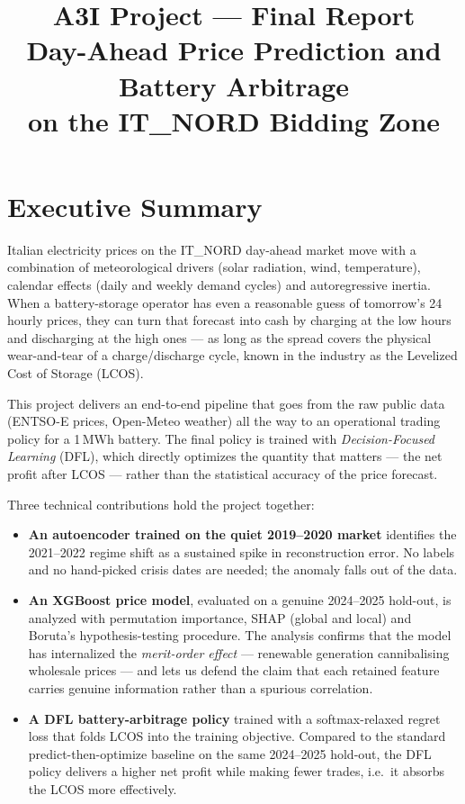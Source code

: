 \documentclass[11pt,a4paper]{article}
\title{\textbf{A3I Project --- Final Report}\\[0.3em]
\large Day-Ahead Price Prediction and Battery Arbitrage\\
on the IT\_NORD Bidding Zone}
\author{}
\date{}
\begin{document}
\maketitle

\section{Executive Summary}

Italian electricity prices on the IT\_NORD day-ahead market move with a
combination of meteorological drivers (solar radiation, wind, temperature),
calendar effects (daily and weekly demand cycles) and autoregressive
inertia. When a battery-storage operator has even a reasonable guess of
tomorrow's 24 hourly prices, they can turn that forecast into cash by
charging at the low hours and discharging at the high ones --- as long as
the spread covers the physical wear-and-tear of a charge/discharge cycle,
known in the industry as the Levelized Cost of Storage (LCOS).

This project delivers an end-to-end pipeline that goes from the raw
public data (ENTSO-E prices, Open-Meteo weather) all the way to an
operational trading policy for a 1\,MWh battery. The final policy is
trained with \emph{Decision-Focused Learning} (DFL), which directly
optimizes the quantity that matters --- the net profit after LCOS ---
rather than the statistical accuracy of the price forecast.

Three technical contributions hold the project together:

\begin{itemize}[leftmargin=1.5em]
  \item \textbf{An autoencoder trained on the quiet 2019--2020 market}
    identifies the 2021--2022 regime shift as a sustained spike in
    reconstruction error. No labels and no hand-picked crisis dates are
    needed; the anomaly falls out of the data.

  \item \textbf{An XGBoost price model}, evaluated on a genuine
    2024--2025 hold-out, is analyzed with permutation importance, SHAP
    (global and local) and Boruta's hypothesis-testing procedure. The
    analysis confirms that the model has internalized the
    \emph{merit-order effect} --- renewable generation cannibalising
    wholesale prices --- and lets us defend the claim that each retained
    feature carries genuine information rather than a spurious
    correlation.

  \item \textbf{A DFL battery-arbitrage policy} trained with a
    softmax-relaxed regret loss that folds LCOS into the training
    objective. Compared to the standard predict-then-optimize baseline
    on the same 2024--2025 hold-out, the DFL policy delivers a higher
    net profit while making fewer trades, i.e.\ it absorbs the LCOS more
    effectively.
\end{itemize}
\end{document}
